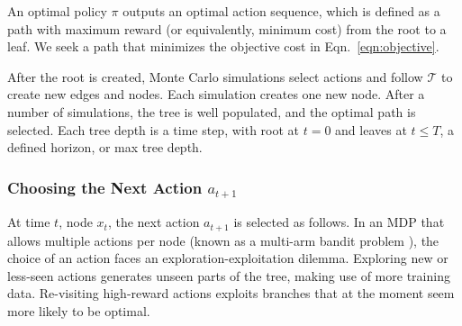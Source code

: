 \documentclass[letterpaper, 10 pt, conference]{ieeeconf}  %
\newcommand{\TODO}[1]{{\color{red}TODO: #1}}
\begin{document}


An optimal policy $\pi$ outputs an optimal action sequence, which is defined as a path with maximum reward (or equivalently, minimum cost) from the root to a leaf. We seek a path that minimizes the objective cost in Eqn.~\ref{eqn:objective}.

After the root is created, Monte Carlo simulations select actions and follow $\mathcal{T}$ to create new edges and nodes.
Each simulation creates one new node.
After a number of simulations, the tree is well populated, and the optimal path is selected.
Each tree depth is a time step, with root at $t=0$ and leaves at $t \leq T$, a defined horizon, or max tree depth.





\subsubsection{Choosing the Next Action $a_{t+1}$}

At time %
$t$, node $x_t$, the next action $a_{t+1}$ is selected as follows.
In an MDP that allows multiple actions per node (known as a multi-arm bandit problem \cite{browne2012}), the choice of an action faces an exploration-exploitation dilemma.
Exploring new or less-seen actions generates unseen parts of the tree, making use of more training data. Re-visiting high-reward actions exploits branches that at the moment seem more likely to be optimal. 
\end{document}
